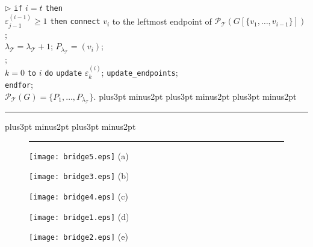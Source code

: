 \documentclass[10pt]{article}
\def\yskip{\penalty-50\vskip3pt plus3pt minus2pt}
\def\y{\yskip}
\def\yyy{\yskip\yskip\yskip}
\begin{document}
{$\rhd$ {\tt if} $i=t$ {\tt then}\\
\phantom{\tt el}\phantom{\tt el}{\tt if}
$\varepsilon^{(i-1)}_{j-1} \geq 1$ {\tt then} {\tt connect} $v_i$
to the leftmost endpoint of $\mathcal{P_{\mathcal{T}}}(G[\{v_1,
\ldots, v_{i-1}\}])$;\\
\phantom{\tt el}\phantom{\tt el}{\tt else}
$\lambda_\mathcal{T}=\lambda_\mathcal{T}+1$;
$P_{\lambda_\mathcal{T}}=(v_i)$;\\
\phantom{\tt el}{\tt endif};\\
\phantom{\tt el}{\tt for} $k=0$ {\tt to} $i$ {\tt do} {\tt update} $\varepsilon^{(i)}_k$;   {\tt update\_endpoints};\\
{\tt endfor};\\
  $\mathcal{P_{\mathcal{T}}}(G)=\{P_1, \ldots,
  P_{\lambda_\mathcal{T}}\}$.
\yyy \hrule \y\y}
\normalsize{
\bigskip

\begin{figure}[t]
\hrule \bigskip \hspace*{0.3in}
   \begin{minipage}[l]{2in}
    \texttt{[image: bridge5.eps]}
    \hspace*{1in}\small{(a)}
  \end{minipage}
  \begin{minipage}[r]{2in}
   \hspace*{1.1in}
    \texttt{[image: bridge3.eps]}
   \hspace*{2.2in}\small{(b)}
  \end{minipage}
\vspace{0.2in}

\hspace*{0.25in}
  \begin{minipage}[c]{2in}
    \hspace*{0.05in}
    \texttt{[image: bridge4.eps]}
   \hspace*{1.05in}\small{(c)}
  \end{minipage}
 \begin{minipage}[c]{2in}
    \hspace*{0.9in}
    \texttt{[image: bridge1.eps]}
   \hspace*{2.25in}\small{(d)}
  \end{minipage}
\vspace{0.2in}
 \vspace*{-0.2in}

\hspace*{0.25in}
 \begin{minipage}[c]{2in}
    \hspace*{1.5in}
    \texttt{[image: bridge2.eps]}
   \hspace*{2.9in}\small{(e)}
  \end{minipage}


\end{figure}}
\end{document}

